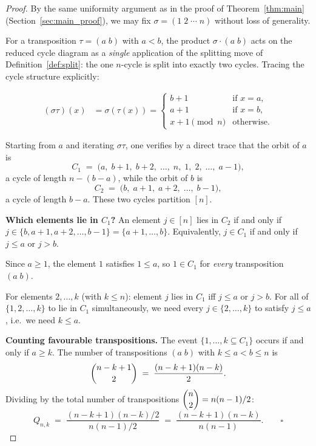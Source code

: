 \documentclass[12pt,a4paper]{article}
\theoremstyle{definition}
\renewcommand{\binom}[2]{\dbinom{#1}{#2}}
\begin{document}
\begin{proof}
By the same uniformity argument as in the proof of
Theorem~\ref{thm:main} (Section~\ref{sec:main_proof}), we may fix
$\sigma = (1\;2\;\cdots\;n)$ without loss of generality.

For a transposition $\tau=(a\;b)$ with $a < b$, the product
$\sigma\cdot(a\;b)$ acts on the reduced cycle diagram as
a \emph{single} application of the splitting move of
Definition~\ref{def:split}: the one $n$-cycle is split into exactly
two cycles.  Tracing the cycle structure explicitly:

\begin{align*}
(\sigma\tau)(x) &= \sigma(\tau(x)) =
\begin{cases}
b+1 & \text{if } x = a,\\
a+1 & \text{if } x = b,\\
x+1 \pmod{n} & \text{otherwise}.
\end{cases}
\end{align*}

Starting from $a$ and iterating $\sigma\tau$, one verifies by a direct
trace that the orbit of $a$ is
\[
C_1 \;=\; \bigl(a,\; b+1,\; b+2,\;\dots,\; n,\; 1,\; 2,\;\dots,\; a-1\bigr),
\]
a cycle of length $n-(b-a)$, while the orbit of $b$ is
\[
C_2 \;=\; \bigl(b,\; a+1,\; a+2,\;\dots,\; b-1\bigr),
\]
a cycle of length $b-a$.  These two cycles partition $[n]$.

\medskip
\noindent\textbf{Which elements lie in $C_1$?}  An element $j\in[n]$ lies
in $C_2$ if and only if $j\in\{b,a+1,a+2,\dots,b-1\} = \{a+1,\dots,b\}$.
Equivalently, $j\in C_1$ if and only if $j\le a$ or $j > b$.

Since $a\ge 1$, the element $1$ satisfies $1\le a$, so
$1\in C_1$ for \emph{every} transposition $(a\;b)$.

For elements $2,\dots,k$ (with $k\le n$): element $j$ lies in $C_1$
iff $j\le a$ or $j>b$.  For all of $\{1,2,\dots,k\}$ to lie in $C_1$
simultaneously, we need every $j\in\{2,\dots,k\}$ to satisfy $j\le a$,
i.e.\ we need $k\le a$.

\medskip
\noindent\textbf{Counting favourable transpositions.}  The event
$\{1,\dots,k\subseteq C_1\}$ occurs if and only if $a\ge k$.  The
number of transpositions $(a\;b)$ with $k\le a < b \le n$ is
\[
\binom{n-k+1}{2} \;=\; \frac{(n-k+1)(n-k)}{2}.
\]
Dividing by the total number of transpositions $\binom{n}{2}=n(n-1)/2$:
\[
Q_{n,k} \;=\; \frac{(n-k+1)(n-k)/2}{n(n-1)/2}
\;=\; \frac{(n-k+1)(n-k)}{n(n-1)}.  \qquad\square
\]
\end{proof}
\end{document}
